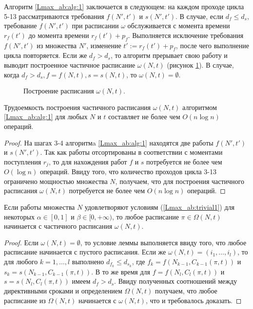 Алгоритм \ref{Lmax_ab:alg:1} заключается в следующем: на каждом проходе цикла 5-13 рассматриваются требования $f(N',t')$ и $s(N',t')$. В случае, если $d_f \leq d_s$, требование $f(N', t')$ при расписании $\omega$ обслуживается с момента времени $r_f(t')$ до момента времени $r_f(t')+p_f$. Выполняется исключение требования $f(N', t')$ из множества $N'$, изменение $t':=r_f(t') + p_f$, после чего выполнение цикла повторяется. Если же $d_f > d_s$, то алгоритм прерывает свою работу и выводит построенное частичное расписание $\omega(N, t)$ (рисунок \ref{Lmax_ab:ris:2}). В случае, когда $d_f > d_s, f = f(N, t), s=s(N,t)$, то $\omega(N,t) = \emptyset$.

\begin{figure}[h!]
\caption{Построение расписания $\omega(N,t)$.}
\label{Lmax_ab:ris:2}
\end{figure}

\begin{lemma} \label{Lmax_ab:lm:2}
Трудоемкость построения частичного расписания $\omega(N, t)$ алгоритмом \ref{Lmax_ab:alg:1} для любых $N$ и $t$ составляет не более чем $O(n \log n)$ операций.
\end{lemma}
\begin{proof}
На шагах 3-4 алгоритмa \ref{Lmax_ab:alg:1} находятся две работы $f(N', t')$ и $s(N', t')$. Так как работы отсортированы в соответствии с моментами поступления $r_j$, то для нахождения работ $f$ и $s$ потребуется не более чем $O(\log n)$ операций. Ввиду того, что количество проходов цикла 3-13 ограничено мощностью множества $N$, получаем, что для построения частичного расписания $\omega(N, t)$ потребуется не более чем $O(n \log n)$ операций.
\end{proof}

\begin{lemma} \label{Lmax_ab:lm:3}
Если работы множества $N$ удовлетворяют условиям (\ref{Lmax_ab:trivial1}) для некоторых $\alpha \in [0,1]$ и $\beta \in [0, +\infty)$, то любое расписание $\pi \in \Omega(N, t)$ начинается с частичного расписания $\omega(N, t)$.
\end{lemma}
\begin{proof}
Если $\omega(N, t) = \emptyset$, то условие леммы выполняется ввиду того, что любое расписание начинается с пустого расписания.
Если же $\omega(N, t) = (i_1, \dots, i_l)$, то для любого $k = 1, \dots, l$ выполнено $d_{f_k} \leq d_{s_k}$, где $f_k = f(N_{k-1}, C_{k-1}(\pi,t))$ и $s_k = s(N_{k-1}, C_{k-1}(\pi,t)).$ В то же время для $f = f(N_l, C_l(\pi,t))$ и $s = s(N_l, C_l(\pi,t))$ имеем $d_f > d_s$. Ввиду полученных соотношений между директивными сроками и определением $\Omega(N, t)$ получаем, что любое расписание из $\Omega(N, t)$ начинается с $\omega(N, t)$, что и требовалось доказать.
\end{proof}

